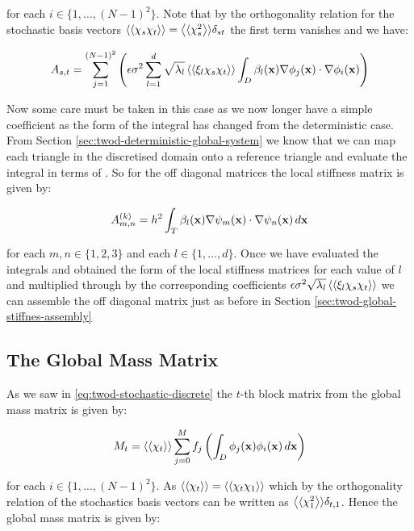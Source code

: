 for each $i \in \{1,\ldots,(N-1)^2\}$. Note that by the orthogonality
relation for the stochastic basis vectors $\left\langle\langle\chi_s\chi_t\right\rangle\rangle =
\left\langle\langle\chi_s^2\right\rangle\rangle\delta_{st}$ the first term vanishes and we have:

\begin{equation}
    A_{s,t} = \sum_{j=1}^{(N-1)^2}\left(\epsilon\sigma^2
    \sum_{l=1}^d\sqrt{\lambda_l}\left\langle\langle\xi_l\chi_s\chi_t\right\rangle\rangle
    \int_D\beta_l(\mathbf{x})\nabla\phi_j(\mathbf{x})\cdot\nabla\phi_i(\mathbf{x})\right)
\end{equation}

Now some care must be taken in this case as we now longer have a simple
coefficient as the form of the integral has changed from the deterministic
case. From Section \ref{sec:twod-deterministic-global-system} we know that we
can map each triangle in the discretised domain onto a reference triangle and
evaluate the integral in terms of . So for the off
diagonal matrices the local stiffness matrix is given by:

\begin{equation}
    A^{(k)}_{m,n} =
    h^2\int_T\beta_l(\mathbf{x})\nabla\psi_m(\mathbf{x})\cdot\nabla\psi_n(\mathbf{x})\, d\mathbf{x}
\end{equation}

for each $m, n \in \{1, 2, 3\}$ and each $l \in \{1, \ldots, d\}$. Once we have
evaluated the integrals and obtained the form of the local stiffness matrices
for each value of $l$ and multiplied through by the corresponding coefficients
$\epsilon\sigma^2\sqrt{\lambda_l}\left\langle\langle\xi_l\chi_s\chi_t\right\rangle\rangle$ we can assemble
the off diagonal matrix just as before in Section
\ref{sec:twod-global-stiffnes-assembly}

\subsection{The Global Mass Matrix}

As we saw in \ref{eq:twod-stochastic-discrete} the $t$-th block matrix from the
global mass matrix is given by:

\begin{equation}
    M_t = \left\langle\langle\chi_t\right\rangle\rangle\sum_{j=0}^Mf_j
    \left(\int_D\phi_j(\mathbf{x})\phi_i(\mathbf{x})\, d\mathbf{x}\right)
\end{equation}

for each $i \in \{1, \ldots, (N-1)^2\}$. As $\left\langle\langle\chi_t\right\rangle\rangle =
\left\langle\langle\chi_t\chi_1\right\rangle\rangle$ which by the orthogonality relation of the stochastics basis
vectors can be written as $\left\langle\langle\chi_1^2\right\rangle\rangle\delta_{t,1}$. Hence the global
mass matrix is given by:

